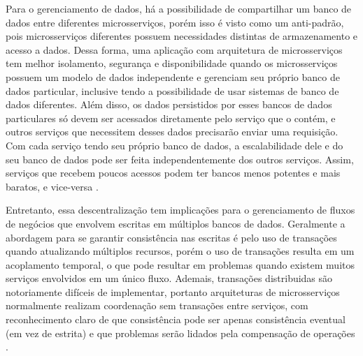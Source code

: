 Para o gerenciamento de dados, há a possibilidade de compartilhar um banco de dados entre diferentes microsserviços, porém isso é visto como um anti-padrão, pois microsserviços diferentes possuem necessidades distintas de armazenamento e acesso a dados. Dessa forma, uma aplicação com arquitetura de microsserviços tem melhor isolamento, segurança e disponibilidade quando os microsserviços possuem um modelo de dados independente e gerenciam seu próprio banco de dados particular, inclusive tendo a possibilidade de usar sistemas de banco de dados diferentes. Além disso, os dados persistidos por esses bancos de dados particulares só devem ser acessados diretamente pelo serviço que o contém, e outros serviços que necessitem desses dados precisarão enviar uma requisição. Com cada serviço tendo seu próprio banco de dados, a escalabilidade dele e do seu banco de dados pode ser feita independentemente dos outros serviços. Assim, serviços que recebem poucos acessos podem ter bancos menos potentes e mais baratos, e vice-versa \cite{oracle_microservices,martin-fowler-microservices}.

Entretanto, essa descentralização tem implicações para o gerenciamento de fluxos de negócios que envolvem escritas em múltiplos bancos de dados. Geralmente a abordagem para se garantir consistência nas escritas é pelo uso de transações quando atualizando múltiplos recursos, porém o uso de transações resulta em um acoplamento temporal, o que pode resultar em problemas quando existem muitos serviços envolvidos em um único fluxo. Ademais, transações distribuidas são notoriamente difíceis de implementar, portanto arquiteturas de microsserviços normalmente realizam coordenação sem transações entre serviços, com reconhecimento claro de que consistência pode ser apenas consistência eventual (em vez de estrita) e que problemas serão lidados pela compensação de operações \cite{martin-fowler-microservices}. 




